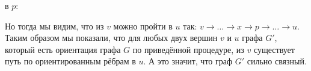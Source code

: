 в $p$:
\begin{figure}[ht!]
\centering
{}
\end{figure}
Но тогда мы видим, что из $v$ можно пройти в $u$ так: $v \rightarrow \ldots \rightarrow x \rightarrow p \rightarrow \ldots \rightarrow u$. Таким образом мы показали, что для любых двух вершин $v$ и $u$ графа $G'$, который есть ориентация графа $G$ по приведённой процедуре, из $v$ существует путь по ориентированным рёбрам в $u$. А это значит, 
что граф $G'$ сильно связный. \xqed

